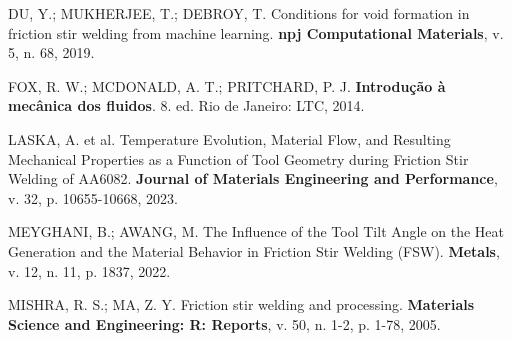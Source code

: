 \documentclass[12pt,openany]{report}
\begin{document}
\begin{singlespace}
DU, Y.; MUKHERJEE, T.; DEBROY, T. Conditions for void formation in friction stir welding from machine learning. \textbf{npj Computational Materials}, v. 5, n. 68, 2019.

FOX, R. W.; MCDONALD, A. T.; PRITCHARD, P. J. \textbf{Introdução à mecânica dos fluidos}. 8. ed. Rio de Janeiro: LTC, 2014.

LASKA, A. et al. Temperature Evolution, Material Flow, and Resulting Mechanical Properties as a Function of Tool Geometry during Friction Stir Welding of AA6082. \textbf{Journal of Materials Engineering and Performance}, v. 32, p. 10655-10668, 2023.

MEYGHANI, B.; AWANG, M. The Influence of the Tool Tilt Angle on the Heat Generation and the Material Behavior in Friction Stir Welding (FSW). \textbf{Metals}, v. 12, n. 11, p. 1837, 2022.

MISHRA, R. S.; MA, Z. Y. Friction stir welding and processing. \textbf{Materials Science and Engineering: R: Reports}, v. 50, n. 1-2, p. 1-78, 2005.
\end{singlespace}
\end{document}
